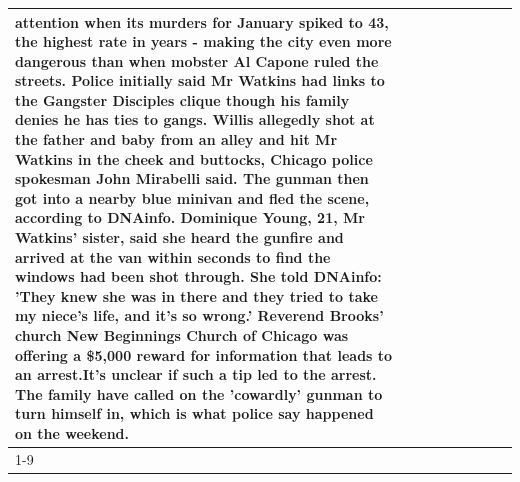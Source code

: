 \begin{table}[H]
\begin{tabular}{lllrlllll}
attention when its murders for January spiked to 43, the highest rate in years - making the city even more dangerous than when mobster Al Capone ruled the streets. Police initially said Mr Watkins had links to the Gangster Disciples clique though his family denies he has ties to gangs. Willis allegedly shot at the father and baby from an alley and hit Mr Watkins in the cheek and buttocks, Chicago police spokesman John Mirabelli said. The gunman then got into a nearby blue minivan and fled the scene, according to DNAinfo. Dominique Young, 21, Mr Watkins' sister, said she heard the gunfire and arrived at the van within seconds to find the windows had been shot through. She told DNAinfo: 'They knew she was in there and they tried to take my niece's life, and it's so wrong.' Reverend Brooks' church New Beginnings Church of Chicago was offering a \$5,000 reward for information that leads to an arrest.It's unclear if such a tip led to the arrest. The family have called on the 'cowardly' gunman to turn himself in, which is what police say happened on the weekend.📃 \\
\cline{1-9}

\end{tabular}
\end{table}
